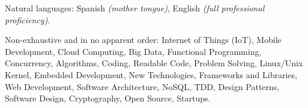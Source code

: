 \documentclass[10pt,a4paper]{article}
\begin{document}
\vspace{0.5em}
\inlineheadsection
  {Natural languages:}
  {Spanish \emph{(mother tongue)}, English \emph{(full professional proficiency)}.}


\spacedhrule{1.6em}{-0.4em}


\inlineheadsection
  {Non-exhaustive and in no apparent order:}
  {Internet of Things (IoT), Mobile Development, Cloud Computing, Big Data,
    Functional Programming, Concurrency, Algorithms, Coding, Readable Code,
    Problem Solving, Linux/Unix Kernel, Embedded Development, New Technologies,
    Frameworks and Libraries, Web Development, Software Architecture, NoSQL,
    TDD, Design Patterns, Software Design, Cryptography, Open Source, Startups.}
\end{document}
